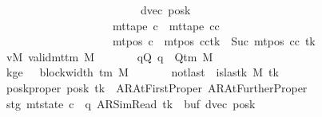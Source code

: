 \begin{isabellebody}
\ \ \ \ \ \ \ \ \ \ \ \ \ \ \ \ \ \ \ \ \ \ \ \ \ \ \ \ \ \ \ dvec{\isacharcomma}{\kern0pt}\ posk{\isacharprime}{\kern0pt}{\isacharparenright}{\kern0pt}\isanewline
\ \ \ \ \ \ \ \ \ \ \ \ \ \ \ \ \ \ \ \ \ \ \ \ \ {\isasymand}\ mt{\isacharunderscore}{\kern0pt}tape\ c{\isacharprime}{\kern0pt}{\isacharprime}{\kern0pt}\ {\isacharequal}{\kern0pt}\ mt{\isacharunderscore}{\kern0pt}tape\ cc\isanewline
\ \ \ \ \ \ \ \ \ \ \ \ \ \ \ \ \ \ \ \ \ \ \ \ \ {\isasymand}\ mt{\isacharunderscore}{\kern0pt}pos\ c{\isacharprime}{\kern0pt}{\isacharprime}{\kern0pt}\ {\isacharequal}{\kern0pt}\ {\isacharparenleft}{\kern0pt}mt{\isacharunderscore}{\kern0pt}pos\ cc{\isacharparenright}{\kern0pt}{\isacharparenleft}{\kern0pt}tk\ {\isacharcolon}{\kern0pt}{\isacharequal}{\kern0pt}\ Suc\ {\isacharparenleft}{\kern0pt}mt{\isacharunderscore}{\kern0pt}pos\ cc\ tk{\isacharparenright}{\kern0pt}{\isacharparenright}{\kern0pt}{\isachardoublequoteclose}\isanewline
\ \ \ \ \ \ \ vM{\isacharcolon}{\kern0pt}\ {\isachardoublequoteopen}valid{\isacharunderscore}{\kern0pt}mttm\ M{\isachardoublequoteclose}\isanewline
\ \ \ \ \ \ \ qQ{\isacharcolon}{\kern0pt}\ {\isachardoublequoteopen}q\ {\isasymin}\ Q{\isacharunderscore}{\kern0pt}tm\ M{\isachardoublequoteclose}\isanewline
\ \ \ \ \ \ \ kge{}{\isacharcolon}{\kern0pt}\ {\isachardoublequoteopen}{}\ {\isasymle}\ block{\isacharunderscore}{\kern0pt}width\ {\isacharparenleft}{\kern0pt}{\isasymGamma}{\isacharunderscore}{\kern0pt}tm\ M{\isacharparenright}{\kern0pt}{\isachardoublequoteclose}\isanewline
\ \ \ \ \ \ \ notlast{\isacharcolon}{\kern0pt}\ {\isachardoublequoteopen}{\isasymnot}\ is{\isacharunderscore}{\kern0pt}last{\isacharunderscore}{\kern0pt}k\ M\ tk{\isachardoublequoteclose}\isanewline
\ \ \ \ \ \ \ posk{\isacharunderscore}{\kern0pt}proper{\isacharcolon}{\kern0pt}\ {\isachardoublequoteopen}posk\ tk\ {\isasymin}\ {\isacharbraceleft}{\kern0pt}AR{\isacharunderscore}{\kern0pt}AtFirstProper{\isacharcomma}{\kern0pt}\ AR{\isacharunderscore}{\kern0pt}AtFurtherProper{\isacharbraceright}{\kern0pt}{\isachardoublequoteclose}\isanewline
\ \ \ \ \ \ \ stg{\isacharcolon}{\kern0pt}\ {\isachardoublequoteopen}mt{\isacharunderscore}{\kern0pt}state\ c{\isacharprime}{\kern0pt}\ {\isacharequal}{\kern0pt}\ {\isacharparenleft}{\kern0pt}q{\isacharcomma}{\kern0pt}\ AR{\isacharunderscore}{\kern0pt}SimRead{\isacharcomma}{\kern0pt}\ tk{\isacharcomma}{\kern0pt}\ {}{\isacharcomma}{\kern0pt}\ buf{\isacharcomma}{\kern0pt}\ dvec{\isacharcomma}{\kern0pt}\ posk{\isacharparenright}{\kern0pt}{\isachardoublequoteclose}\isanewline

\end{isabellebody}
